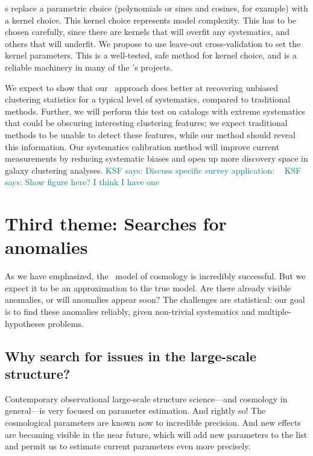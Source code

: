 \documentclass[12pt, fullpage, letterpaper]{article}
\newcommand{\KSF}[1]{\textcolor{teal}{KSF says: #1}}
\begin{document}
\GP s replace a parametric choice (polynomials or sines and cosines, for example) with a kernel choice.
This kernel choice represents model complexity.
This has to be chosen carefully, since there are kernels that will overfit any systematics, and others that will underfit.
We propose to use leave-out cross-validation to set the kernel parameters.
This is a well-tested, safe method for kernel choice, and is a reliable machinery in many of the \PI's projects.

We expect to show that our \GP\ approach does better at recovering unbiased clustering statistics for a typical level of systematics, compared to traditional methods.
Further, we will perform this test on catalogs with extreme systematics that could be obscuring interesting clustering features; we expect traditional methods to be unable to detect these features, while our method should reveal this information.
Our systematics calibration method will improve current measurements by reducing systematic biases and open up more discovery space in galaxy clustering analyses.
\KSF{Discuss specific survey application: \SDSSIV\ \eBOSS}
\KSF{Show figure here? I think I have one}

\section{Third theme: Searches for anomalies}

As we have emphasized, the \LCDM\ model of cosmology is incredibly successful.
But we expect it to be an approximation to the true model.
Are there already visible anomalies, or will anomalies appear soon?
The challenges are statistical: our goal is to find these anomalies reliably, given
non-trivial systematics and multiple-hypotheses problems.

\subsection{Why search for issues in the large-scale structure?}

Contemporary observational large-scale structure science---and
cosmology in general---is very focused on parameter estimation.
And rightly so!
The cosmological parameters are known now to incredible precision.
And new effects are becoming visible in the near future, which will add
new parameters to the list and permit us to estimate current
parameters even more precisely.
\end{document}
